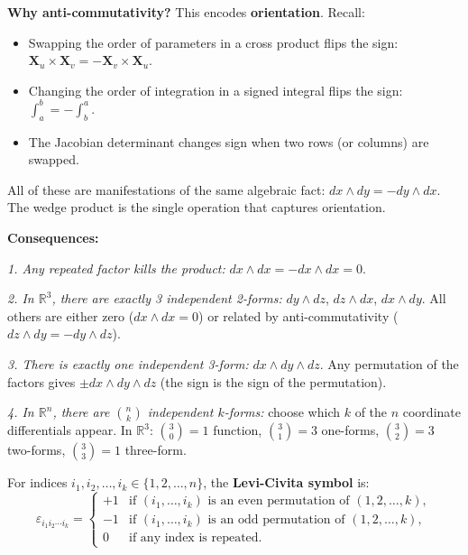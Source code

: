 \documentclass[11pt]{report}
\newcommand{\R}{\mathbb{R}}
\begin{document}
\textbf{Why anti-commutativity?} This encodes \textbf{orientation}. Recall:
\begin{itemize}
    \item Swapping the order of parameters in a cross product flips the sign: $\mathbf{X}_u \times \mathbf{X}_v = -\mathbf{X}_v \times \mathbf{X}_u$.
    \item Changing the order of integration in a signed integral flips the sign: $\int_a^b = -\int_b^a$.
    \item The Jacobian determinant changes sign when two rows (or columns) are swapped.
\end{itemize}

All of these are manifestations of the same algebraic fact: $dx \wedge dy = -dy \wedge dx$. The wedge product is the single operation that captures orientation.

\textbf{Consequences:}

\textit{1. Any repeated factor kills the product:} $dx \wedge dx = -dx \wedge dx = 0$.

\textit{2. In $\R^3$, there are exactly 3 independent 2-forms:} $dy \wedge dz$, $dz \wedge dx$, $dx \wedge dy$. All others are either zero ($dx \wedge dx = 0$) or related by anti-commutativity ($dz \wedge dy = -dy \wedge dz$).

\textit{3. There is exactly one independent 3-form:} $dx \wedge dy \wedge dz$. Any permutation of the factors gives $\pm dx \wedge dy \wedge dz$ (the sign is the sign of the permutation).

\textit{4. In $\R^n$, there are $\binom{n}{k}$ independent $k$-forms:} choose which $k$ of the $n$ coordinate differentials appear. In $\R^3$: $\binom{3}{0} = 1$ function, $\binom{3}{1} = 3$ one-forms, $\binom{3}{2} = 3$ two-forms, $\binom{3}{3} = 1$ three-form.

\begin{definition}
For indices $i_1, i_2, \ldots, i_k \in \{1, 2, \ldots, n\}$, the \textbf{Levi-Civita symbol} is:
\[
\varepsilon_{i_1 i_2 \cdots i_k} = \begin{cases} +1 & \text{if } (i_1, \ldots, i_k) \text{ is an even permutation of } (1, 2, \ldots, k), \\ -1 & \text{if } (i_1, \ldots, i_k) \text{ is an odd permutation of } (1, 2, \ldots, k), \\ 0 & \text{if any index is repeated.} \end{cases}
\]
\end{definition}
\end{document}
